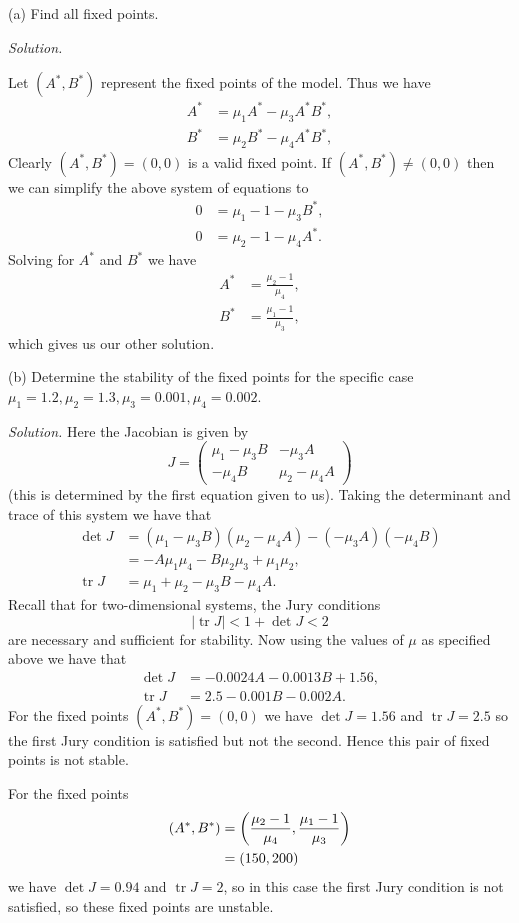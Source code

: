 \documentclass{article}
\DeclareMathOperator{\tr}{tr}
\newcommand{\As}{A^*}
\newcommand{\Bs}{B^*}
\begin{document}
(a) Find all fixed points.

\textit{Solution.}

Let $(\As, \Bs)$ represent the fixed points of the model. Thus we have
%
\begin{align*}
    \As &= \mu_1 \As - \mu_3 \As \Bs, \\
    \Bs &= \mu_2 \Bs - \mu_4 \As \Bs,
\end{align*}
%
Clearly $(\As, \Bs) = (0, 0)$ is a valid fixed point.
If $(\As, \Bs) \neq (0, 0)$ then we can simplify the above system of equations to
%
\begin{align*}
    0 &= \mu_1 - 1 - \mu_3 \Bs, \\
    0 &= \mu_2 - 1 - \mu_4 \As.
\end{align*}
%
Solving for $\As$ and $\Bs$ we have
%
\begin{align*}
    \As &= \frac{\mu_2 - 1}{\mu_4}, \\
    \Bs &= \frac{\mu_1 - 1}{\mu_3},
\end{align*}
%
which gives us our other solution.


\vspace{5mm}

(b) Determine the stability of the fixed points for the specific case
$\mu_1 = 1.2, \mu_2 = 1.3, \mu_3 = 0.001, \mu_4 = 0.002$.

\textit{Solution.}
Here the Jacobian is given by
%
\begin{equation*}
    J =
        \begin{pmatrix}
            \mu_1 - \mu_3 B & -\mu_3 A \\
            - \mu_4 B & \mu_2 - \mu_4 A
        \end{pmatrix}
\end{equation*}
%
(this is determined by the first equation given to us).
Taking the determinant and trace of this system we have that
%
\begin{align*}
    \det J &= (\mu_1 - \mu_3 B) (\mu_2 - \mu_4 A) - (- \mu_3 A) (- \mu_4 B) \\
           &= -A \mu_1 \mu_4 - B \mu_2 \mu_3 + \mu_1 \mu_2
           ,
           \\
    \tr J &= \mu_1 + \mu_2 - \mu_3 B - \mu_4 A
    .
\end{align*}
%
Recall that for two-dimensional systems, the Jury conditions
%
\begin{equation*}
    |\tr J| < 1 + \det J < 2
\end{equation*}
%
are necessary and sufficient for stability. Now using the values of $\mu$
as specified above we have that
%
\begin{align*}
    \det J &= - 0.0024 A - 0.0013 B + 1.56, \\
    \tr J &= 2.5 - 0.001 B - 0.002 A
    .
\end{align*}
%
For the fixed points $(\As, \Bs) = (0, 0)$ we have $\det J = 1.56$ and
$\tr J = 2.5$ so the first Jury condition is satisfied but not the
second. Hence this pair of fixed points is not stable.

For the fixed points
%
\begin{align*}
    (\As, \Bs)
        &= \del{\frac{\mu_2 - 1}{\mu_4}, \frac{\mu_1 - 1}{\mu_3}} \\
        &= (150, 200)
\end{align*}
%
we have $\det J = 0.94$ and $\tr J = 2$, so in this case the first Jury
condition is not satisfied, so these fixed points are unstable.
\end{document}
